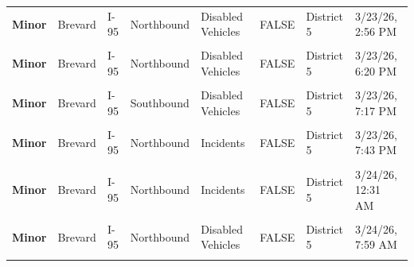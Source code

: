 \documentclass[
]{article}
\begin{document}
\begin{longtable}[t]{>{\raggedright\arraybackslash}p{1.5cm}>{\raggedright\arraybackslash}p{2.5cm}>{\raggedright\arraybackslash}p{3cm}>{\raggedright\arraybackslash}p{1.8cm}>{\raggedright\arraybackslash}p{2.5cm}lll}
\textbf{Minor} & Brevard & I-95 & Northbound & Disabled Vehicles & FALSE & District 5 & 3/23/26, 2:56 PM\\
\addlinespace
\textbf{\cellcolor{gray!10}{Minor}} & \cellcolor{gray!10}{Brevard} & \cellcolor{gray!10}{I-95} & \cellcolor{gray!10}{Southbound} & \cellcolor{gray!10}{Congestion} & \cellcolor{gray!10}{FALSE} & \cellcolor{gray!10}{District 5} & \cellcolor{gray!10}{3/23/26, 6:20 PM}\\
\textbf{Minor} & Brevard & I-95 & Northbound & Disabled Vehicles & FALSE & District 5 & 3/23/26, 6:20 PM\\
\textbf{\cellcolor{gray!10}{Minor}} & \cellcolor{gray!10}{Brevard} & \cellcolor{gray!10}{I-95} & \cellcolor{gray!10}{Northbound} & \cellcolor{gray!10}{Incidents} & \cellcolor{gray!10}{FALSE} & \cellcolor{gray!10}{District 5} & \cellcolor{gray!10}{3/23/26, 9:07 PM}\\
\textbf{Minor} & Brevard & I-95 & Southbound & Disabled Vehicles & FALSE & District 5 & 3/23/26, 7:17 PM\\
\textbf{\cellcolor{gray!10}{Minor}} & \cellcolor{gray!10}{Brevard} & \cellcolor{gray!10}{I-95} & \cellcolor{gray!10}{Northbound} & \cellcolor{gray!10}{Disabled Vehicles} & \cellcolor{gray!10}{FALSE} & \cellcolor{gray!10}{District 5} & \cellcolor{gray!10}{3/23/26, 8:09 PM}\\
\addlinespace
\textbf{Minor} & Brevard & I-95 & Northbound & Incidents & FALSE & District 5 & 3/23/26, 7:43 PM\\
\textbf{\cellcolor{gray!10}{Minor}} & \cellcolor{gray!10}{Brevard} & \cellcolor{gray!10}{I-95} & \cellcolor{gray!10}{Southbound} & \cellcolor{gray!10}{Disabled Vehicles} & \cellcolor{gray!10}{FALSE} & \cellcolor{gray!10}{District 5} & \cellcolor{gray!10}{3/23/26, 11:58 PM}\\
\textbf{Minor} & Brevard & I-95 & Northbound & Incidents & FALSE & District 5 & 3/24/26, 12:31 AM\\
\textbf{\cellcolor{gray!10}{Minor}} & \cellcolor{gray!10}{Brevard} & \cellcolor{gray!10}{I-95} & \cellcolor{gray!10}{Southbound} & \cellcolor{gray!10}{Incidents} & \cellcolor{gray!10}{FALSE} & \cellcolor{gray!10}{District 5} & \cellcolor{gray!10}{3/24/26, 6:34 AM}\\
\textbf{Minor} & Brevard & I-95 & Northbound & Disabled Vehicles & FALSE & District 5 & 3/24/26, 7:59 AM\\
\addlinespace
\textbf{\cellcolor{gray!10}{Minor}} & \cellcolor{gray!10}{Brevard} & \cellcolor{gray!10}{SR-520} & \cellcolor{gray!10}{Eastbound} & \cellcolor{gray!10}{Incidents} & \cellcolor{gray!10}{FALSE} & \cellcolor{gray!10}{District 5} & \cellcolor{gray!10}{3/24/26, 11:30 AM}\\

\end{longtable}
\end{document}
